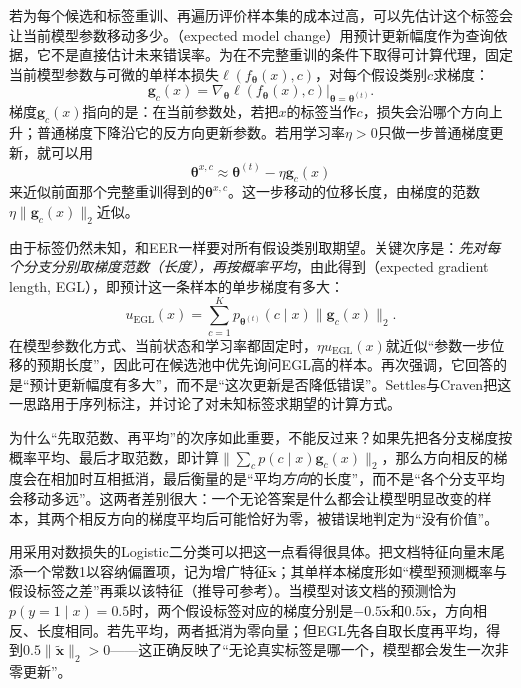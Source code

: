 若为每个候选和标签重训、再遍历评价样本集的成本过高，可以先估计这个标签会让当前模型参数移动多少。（expected model change）用预计更新幅度作为查询依据，它不是直接估计未来错误率。为在不完整重训的条件下取得可计算代理，固定当前模型参数与可微的单样本损失$\ell(f_{\bm{\theta}}(x),c)$，对每个假设类别$c$求梯度：
\begin{equation}
  \bm{g}_c(x)
  =\left.
    \nabla_{\bm{\theta}}
    \ell(f_{\bm{\theta}}(x),c)
    \right|_{\bm{\theta}=\bm{\theta}^{(t)}}.
  \label{eq:knowledge-acquisition-human-hypothetical-gradient}
\end{equation}
梯度$\bm{g}_c(x)$指向的是：在当前参数处，若把$x$的标签当作$c$，损失会沿哪个方向上升；普通梯度下降沿它的反方向更新参数。若用学习率$\eta>0$只做一步普通梯度更新，就可以用
\[
  \bm{\theta}^{x,c}\approx\bm{\theta}^{(t)}-\eta\bm{g}_c(x)
\]
来近似前面那个完整重训得到的$\bm{\theta}^{x,c}$。这一步移动的位移长度，由梯度的范数$\eta\lVert\bm{g}_c(x)\rVert_2$近似。

由于标签仍然未知，和EER一样要对所有假设类别取期望。关键次序是：\emph{先对每个分支分别取梯度范数（长度），再按概率平均}，由此得到（expected gradient length, EGL），即预计这一条样本的单步梯度有多大：
\begin{equation}
  u_{\mathrm{EGL}}(x)
  =\sum_{c=1}^{K}
    p_{\bm{\theta}^{(t)}}(c\mid x)
    \lVert\bm{g}_c(x)\rVert_2.
  \label{eq:knowledge-acquisition-human-expected-gradient-length}
\end{equation}
在模型参数化方式、当前状态和学习率都固定时，$\eta u_{\mathrm{EGL}}(x)$就近似“参数一步位移的预期长度”，因此可在候选池中优先询问EGL高的样本。再次强调，它回答的是“预计更新幅度有多大”，而不是“这次更新是否降低错误”。Settles与Craven把这一思路用于序列标注，并讨论了对未知标签求期望的计算方式。

为什么“先取范数、再平均”的次序如此重要，不能反过来？如果先把各分支梯度按概率平均、最后才取范数，即计算$\lVert\sum_c p(c\mid x)\bm{g}_c(x)\rVert_2$，那么方向相反的梯度会在相加时互相抵消，最后衡量的是“平均\emph{方向}的长度”，而不是“各个分支平均会移动多远”。这两者差别很大：一个无论答案是什么都会让模型明显改变的样本，其两个相反方向的梯度平均后可能恰好为零，被错误地判定为“没有价值”。

用采用对数损失的Logistic二分类可以把这一点看得很具体。把文档特征向量末尾添一个常数1以容纳偏置项，记为增广特征$\widetilde{\bm{x}}$；其单样本梯度形如“模型预测概率与假设标签之差”再乘以该特征（推导可参考）。当模型对该文档的预测恰为$p(y=1\mid x)=0.5$时，两个假设标签对应的梯度分别是$-0.5\widetilde{\bm{x}}$和$0.5\widetilde{\bm{x}}$，方向相反、长度相同。若先平均，两者抵消为零向量；但EGL先各自取长度再平均，得到$0.5\lVert\widetilde{\bm{x}}\rVert_2>0$——这正确反映了“无论真实标签是哪一个，模型都会发生一次非零更新”。

